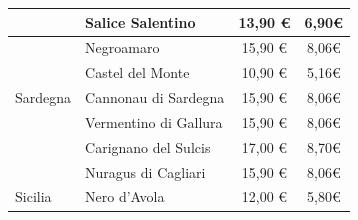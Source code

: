 \documentclass[12pt, a4paper]{article}
\begin{document}
\begin{longtable}{@{}|l|l|c|c|}
                         & Salice Salentino                                                          & 13,90 €                                                         & 6,90€                                                                                                         \\ \hline
                         & Negroamaro                                                                & 15,90 €                                                         & 8,06€                                                                                                         \\ \hline
                         & Castel del Monte                                                          & 10,90 €                                                         & 5,16€                                                                                                         \\ \hline
    Sardegna             & Cannonau di Sardegna                                                      & 15,90 €                                                         & 8,06€                                                                                                         \\ \hline
                         & Vermentino di Gallura                                                     & 15,90 €                                                         & 8,06€                                                                                                         \\ \hline
                         & Carignano del Sulcis                                                      & 17,00 €                                                         & 8,70€                                                                                                         \\ \hline
                         & Nuragus di Cagliari                                                       & 15,90 €                                                         & 8,06€                                                                                                         \\ \hline
    Sicilia              & Nero d'Avola                                                              & 12,00 €                                                         & 5,80€                                                                                                         \\ \hline

\end{longtable}
\end{document}
